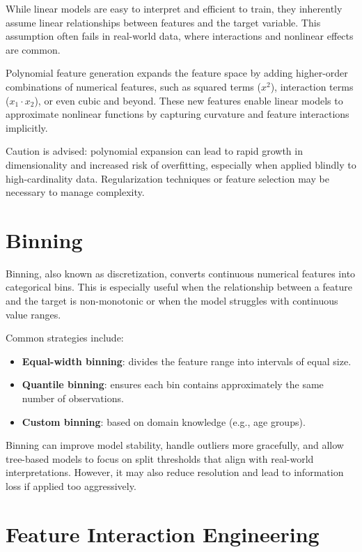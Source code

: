 \documentclass[12pt,openany]{book}
\begin{document}
While linear models are easy to interpret and efficient to train, they inherently assume linear relationships between features and the target variable. This assumption often fails in real-world data, where interactions and nonlinear effects are common.

Polynomial feature generation expands the feature space by adding higher-order combinations of numerical features, such as squared terms (\(x^2\)), interaction terms (\(x_1 \cdot x_2\)), or even cubic and beyond. These new features enable linear models to approximate nonlinear functions by capturing curvature and feature interactions implicitly.

Caution is advised: polynomial expansion can lead to rapid growth in dimensionality and increased risk of overfitting, especially when applied blindly to high-cardinality data. Regularization techniques or feature selection may be necessary to manage complexity.



\section{Binning}

Binning, also known as discretization, converts continuous numerical features into categorical bins. This is especially useful when the relationship between a feature and the target is non-monotonic or when the model struggles with continuous value ranges.

Common strategies include:
\begin{itemize}
    \item \textbf{Equal-width binning}: divides the feature range into intervals of equal size.
    \item \textbf{Quantile binning}: ensures each bin contains approximately the same number of observations.
    \item \textbf{Custom binning}: based on domain knowledge (e.g., age groups).
\end{itemize}

Binning can improve model stability, handle outliers more gracefully, and allow tree-based models to focus on split thresholds that align with real-world interpretations. However, it may also reduce resolution and lead to information loss if applied too aggressively.



\section{Feature Interaction Engineering}
\end{document}
